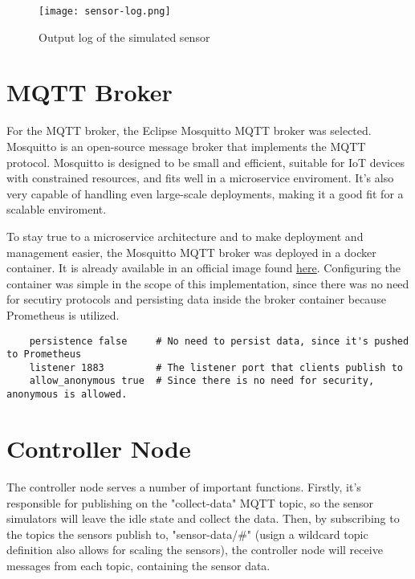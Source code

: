 \begin{figure}[!h]
    \graphicspath{ {./screenshots/} }
    \texttt{[image: sensor-log.png]}
    \centering
    \caption{Output log of the simulated sensor }
    \label{fig:sensor_log}
\end{figure}

\section{MQTT Broker}
For the MQTT broker, the Eclipse Mosquitto MQTT broker was selected. Mosquitto is an open-source message broker that implements the MQTT protocol. Mosquitto is designed to be small and efficient, suitable for IoT devices with constrained resources, and fits well in a microservice enviroment. It's also very capable of handling even large-scale deployments, making it a good fit for a scalable enviroment.

To stay true to a microservice architecture and to make deployment and management easier, the Mosquitto MQTT broker was deployed in a docker container. It is already available in an official image found \href{https://hub.docker.com/_/eclipse-mosquitto}{here}. Configuring the container was simple in the scope of this implementation, since there was no need for secutiry protocols and persisting data inside the broker container because Prometheus is utilized.

\begin{verbatim}
    persistence false     # No need to persist data, since it's pushed to Prometheus
    listener 1883         # The listener port that clients publish to
    allow_anonymous true  # Since there is no need for security, anonymous is allowed.
\end{verbatim}

\section{Controller Node}
The controller node serves a number of important functions. Firstly, it's responsible for publishing on the "collect-data" MQTT topic, so the sensor simulators will leave the idle state and collect the data. Then, by subscribing to the topics the sensors publish to, "sensor-data/\#" (usign a wildcard topic definition also allows for scaling the sensors), the controller node will receive messages from each topic, containing the sensor data.

